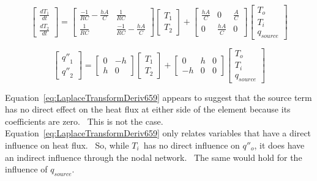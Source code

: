 \begin{equation}
\left[ {\begin{array}{*{20}{c}}{\frac{{d{T_1}}}{{dt}}}\\ {\frac{{d{T_2}}}{{dt}}}\end{array}} \right] = \left[ {\begin{array}{*{20}{c}}{\frac{{ - 1}}{{RC}} - \frac{{hA}}{C}}&{\frac{1}{{RC}}}\\ {\frac{1}{{RC}}}&{\frac{{ - 1}}{{RC}} - \frac{{hA}}{C}}\end{array}} \right]\left[ {\begin{array}{*{20}{c}}{{T_1}}\\ {{T_2}}\end{array}} \right] + \left[ {\begin{array}{*{20}{c}}{\frac{{hA}}{C}}&0&{\frac{A}{C}}\\0&{\frac{{hA}}{C}}&0\end{array}} \right]\left[ {\begin{array}{*{20}{c}}{{T_o}}\\ {{T_i}}\\ {{q_{source}}}\end{array}} \right]
\label{eq:QTFDeriv658}
\end{equation}

\begin{equation}
\left[ {\begin{array}{*{20}{c}}{{{q''}_1}}\\ {{{q''}_2}}\end{array}} \right] = \left[ {\begin{array}{*{20}{c}}0&{ - h}\\h&0\end{array}} \right]\left[ {\begin{array}{*{20}{c}}{{T_1}}\\ {{T_2}}\end{array}} \right] + \left[ {\begin{array}{*{20}{c}}0&h&0\\ { - h}&0&0\end{array}} \right]\left[ {\begin{array}{*{20}{c}}{{T_o}}\\ {{T_i}}\\ {{q_{source}}}\end{array}} \right]
\label{eq:LaplaceTransformDeriv659}
\end{equation}

Equation~\ref{eq:LaplaceTransformDeriv659} appears to suggest that the source term has no direct effect on the heat flux at either side of the element because its coefficients are zero.~ This is not the case.~ Equation~\ref{eq:LaplaceTransformDeriv659} only relates variables that have a direct influence on heat flux.~ So, while \(T_i\)~has no direct influence on \({q''_o}\), it does have an indirect influence through the nodal network.~ The same would hold for the influence of \(q_{source}\).

